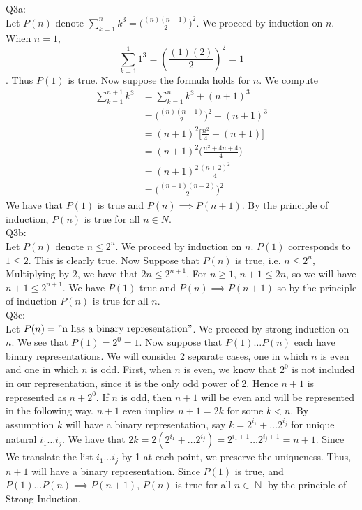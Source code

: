 \documentclass[letterpaper]{article}
\DeclareMathOperator{\N}{\mathbb{N}}
\begin{document}
\noindent Q3a: \\
Let $P(n)$ denote $\sum_{k=1}^n k^3 = \big( \frac{(n)(n+1)}{2} \big)^2$. We proceed by induction on $n$. When $n=1$, $$\sum_{k=1}^1 1^3 = (\frac{(1)(2)}{2})^2 =1$$. Thus $P(1)$ is true. Now suppose the formula holds for $n$. We compute
\begin{align*}
\sum_{k=1}^{n+1} k^3 & = \sum_{k=1}^n k^3 + (n+1)^3
\\ & = \bigg(\frac{(n)(n+1)}{2}\bigg)^2+(n+1)^3 \tag{by induction hypothesis}
\\ & = (n+1)^2\bigg[ \frac{n^2}{4}+ (n+1)\bigg]
\\ & = (n+1)^2 \bigg( \frac{n^2+4n+4}{4} \bigg)
\\ & = (n+1)^2 \frac{(n+2)^2}{4}
\\ & = \bigg(  \frac{(n+1)(n+2)}{2}\bigg)^2
\end{align*}
We have that $P(1)$ is true and $P(n)\implies P(n+1)$. By the principle of induction, $P(n)$ is true for all $n\in N$. 
\\ Q3b: \\
Let $P(n)$ denote $n \leq 2^n$. We proceed by induction on $n$. $P(1)$ corresponds to $1\leq 2$. This is clearly true. Now Suppose that $P(n)$ is true, i.e. $n\leq 2^n$, Multiplying by $2$, we have that $2n \leq 2^{n+1}$. For $n \geq1$, $n+1 \leq 2n$, so we will have $n+1 \leq 2^{n+1} $. We have $P(1)$ true and $P(n)\implies P(n+1)$ so by the principle of induction $P(n)$ is true for all $n$. 
\\ Q3c: \\ Let $P(n) = "\text{n has a binary representation}"$. We proceed by strong induction on $n$. We see that $P(1)=2^0=1$. Now suppose that $P(1)\dots P(n)$ each have binary representations. We will consider 2 separate cases, one in which $n$ is even and one in which $n$ is odd. First, when $n$ is even, we know that $2^0$ is not included in our representation, since it is the only odd power of 2. 
Hence $n+1$ is represented as $n+2^0$. If $n$ is odd, then $n+1$ will be even and will be represented in the following way. $n+1$ even implies $n+1=2k$ for some $k<n$. By assumption $k$ will have a binary representation, say $k= 2^{i_1} + \dots 2^{i_j}$ for unique natural $i_1\dots i_j$. We have that $2k = 2(2^{i_1} + \dots 2^{i_j}) = 2^{i_1 +1} \dots 2^{i_j +1}=n+1$. Since We translate the list $i_1\dots i_j$ by 1 at each point, we preserve the uniqueness. Thus, $n+1$ will have a binary representation. Since $P(1)$ is true, and $P(1)\dots P(n)\implies P(n+1)$, $P(n)$ is true for all $n\in \N$ by the principle of Strong Induction. 
\end{document}
